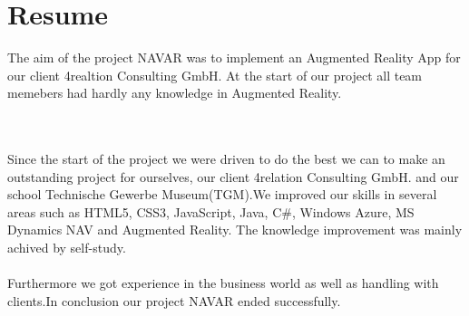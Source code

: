 \chapter{Resume}\label{chapter:Resume}
The aim of the project NAVAR was to implement an Augmented Reality App for our client 4realtion Consulting GmbH. At the start of our project all team memebers had hardly any knowledge in Augmented Reality. 


\
\\\\
Since the start of the project we were driven to do the best we can to make an outstanding project for ourselves, our client 4relation Consulting GmbH. and our school Technische Gewerbe Museum(TGM).We improved our skills in several areas such as HTML5, CSS3, JavaScript, Java, C\#, Windows Azure, MS Dynamics NAV and Augmented Reality. The knowledge improvement was mainly achived by self-study. 
\\
\\
 Furthermore we got experience in the business world as well as handling with clients.In conclusion our project NAVAR ended successfully. 
\clearpage